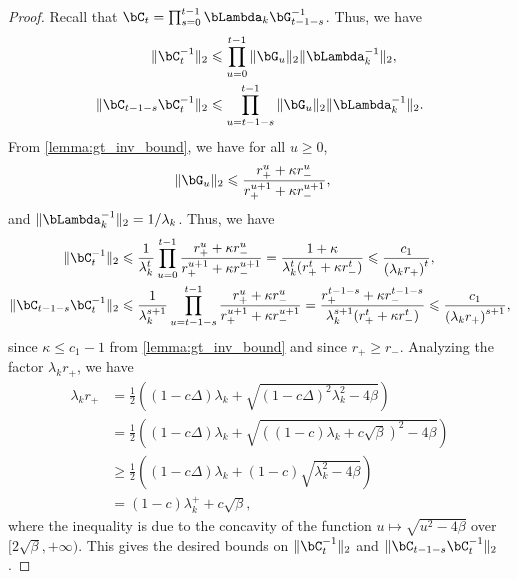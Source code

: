 \documentclass{article}
\theoremstyle{plain}
\theoremstyle{definition}
\theoremstyle{remark}
\begin{document}
\begin{proof}
  Recall that $\bC_t = \prod_{s=0}^{t-1} \bLambda_k \bG_{t-1-s}^{-1}$. Thus, we have
  \begin{align*}
    \Vert \bC_t^{-1} \Vert_2 & \leqslant \prod_{u=0}^{t-1} \Vert \bG_{u} \Vert_2 \Vert \bLambda_k^{-1} \Vert_2, \\
    \Vert \bC_{t-1-s} \bC_t^{-1} \Vert_2 & \leqslant \prod_{u=t-1-s}^{t-1} \Vert \bG_u \Vert_2 \Vert \bLambda_k^{-1} \Vert_2.
  \end{align*}
  From \cref{lemma:gt_inv_bound}, we have for all $u\geqslant 0$,
  \begin{align*}
    \Vert \bG_u \Vert_2 & \leqslant \frac{r_+^u + \kappa r_-^u}{r_+^{u+1} + \kappa r_-^{u+1}},
  \end{align*}
  and $\Vert\bLambda_k^{-1}\Vert_2 = 1/\lambda_k$. Thus, we have
  \begin{align*}
    \Vert \bC_t^{-1} \Vert_2 & \leqslant \frac{1}{\lambda_k^t} \prod_{u=0}^{t-1} \frac{r_+^u + \kappa r_-^u}{r_+^{u+1} + \kappa r_-^{u+1}} = \frac{1 + \kappa }{\lambda_k^t (r_+^{t} + \kappa r_-^{t})} \leqslant \frac{c_1}{\left(\lambda_k r_+\right)^t},\\
    \Vert \bC_{t-1-s} \bC_t^{-1} \Vert_2 & \leqslant \frac{1}{\lambda_k^{s+1}} \prod_{u=t-1-s}^{t-1} \frac{r_+^u + \kappa r_-^u}{r_+^{u+1} + \kappa r_-^{u+1}} = \frac{r_+^{t-1-s} + \kappa r_-^{t-1-s}}{\lambda_k^{s+1} (r_+^{t} + \kappa r_-^{t})} \leqslant \frac{c_1}{\left(\lambda_k r_+\right)^{s+1}},
  \end{align*}
  since $\kappa \leqslant c_1 - 1$ from \cref{lemma:gt_inv_bound} and since $r_+ \geqslant r_-$. Analyzing the factor $\lambda_k r_+$, we have
  \begin{align*}
    \lambda_k r_+ & = \frac{1}{2}\left( (1 - c\Delta)\lambda_k + \sqrt{(1 - c\Delta)^2\lambda_k^2  - 4\beta} \right) \\
    & = \frac{1}{2}\left( (1 - c\Delta)\lambda_k + \sqrt{\left((1 - c)\lambda_k + c\sqrt{\beta}\right)^2  - 4\beta} \right) \\
    & \geqslant \frac{1}{2} \left((1 - c\Delta)\lambda_k  + (1 - c) \sqrt{\lambda_k^2 - 4\beta} \right) \\
    & = (1 - c) \lambda_k^+ + c \sqrt{\beta},
  \end{align*}
  where the inequality is due to the concavity of the function $u \mapsto \sqrt{u^2 - 4\beta}$ over $[2\sqrt{\beta}, +\infty)$. This gives the desired bounds on $\Vert \bC_t^{-1} \Vert_2$ and $\Vert \bC_{t-1-s} \bC_t^{-1} \Vert_2$.


\end{proof}
\end{document}
